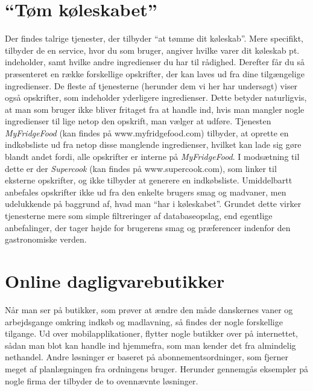 \section{``Tøm køleskabet''}
Der findes talrige tjenester, der tilbyder “at tømme dit køleskab”. 
Mere specifikt, tilbyder de en service, hvor du som bruger, angiver hvilke varer dit køleskab pt. indeholder, samt hvilke andre ingredienser du har til rådighed. 
Derefter får du så præsenteret en række forskellige opskrifter, der kan laves ud fra dine tilgængelige ingredienser. 
De fleste af tjenesterne (herunder dem vi her har undersøgt) viser også opskrifter, som indeholder yderligere ingredienser. 
Dette betyder naturligvis, at man som bruger ikke bliver fritaget fra at handle ind, hvis man mangler nogle ingredienser til lige netop den opskrift, man vælger at udføre. 
Tjenesten \textit{MyFridgeFood} (kan findes på www.myfridgefood.com) tilbyder, at oprette en indkøbsliste ud fra netop disse manglende ingredienser, hvilket kan lade sig gøre blandt andet fordi, alle opskrifter er interne på \textit{MyFridgeFood}. 
I modsætning til dette er der \textit{Supercook} (kan findes på www.supercook.com), som linker til eksterne opskrifter, og ikke tilbyder at generere en indkøbsliste. 
Umiddelbartt anbefales opskrifter ikke ud fra den enkelte brugers smag og madvaner, men udelukkende på baggrund af, hvad man “har i køleskabet”. 
Grundet dette virker tjenesterne mere som simple filtreringer af databaseopslag, end egentlige anbefalinger, der tager højde for brugerens smag og præferencer indenfor den gastronomiske verden.


\section{Online dagligvarebutikker}
Når man ser på butikker, som prøver at ændre den måde danskernes vaner og arbejdsgange omkring indkøb og madlavning, så findes der nogle forskellige tilgange.
Ud over mobilapplikationer, flytter nogle butikker over på internettet, sådan man blot kan handle ind hjemmefra, som man kender det fra almindelig nethandel.
Andre løsninger er baseret på abonnementsordninger, som fjerner meget af planlægningen fra ordningens bruger.
Herunder gennemgås eksempler på nogle firma der tilbyder de to ovennævnte løsninger.

